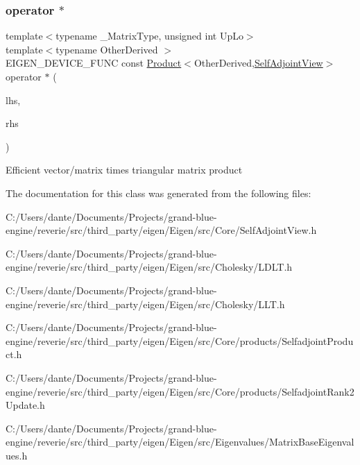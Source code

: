 \subsubsection{\texorpdfstring{operator $\ast$}{operator *}}
{\footnotesize\ttfamily template$<$typename \+\_\+\+Matrix\+Type, unsigned int Up\+Lo$>$ \\
template$<$typename Other\+Derived $>$ \\
E\+I\+G\+E\+N\+\_\+\+D\+E\+V\+I\+C\+E\+\_\+\+F\+U\+NC const \mbox{\hyperlink{class_eigen_1_1_product}{Product}}$<$Other\+Derived,\mbox{\hyperlink{class_eigen_1_1_self_adjoint_view}{Self\+Adjoint\+View}}$>$ operator $\ast$ (\begin{DoxyParamCaption}\item[{const \mbox{\hyperlink{class_eigen_1_1_matrix_base}{Matrix\+Base}}$<$ Other\+Derived $>$ \&}]{lhs,  }\item[{const \mbox{\hyperlink{class_eigen_1_1_self_adjoint_view}{Self\+Adjoint\+View}}$<$ \+\_\+\+Matrix\+Type, Up\+Lo $>$ \&}]{rhs }\end{DoxyParamCaption})\hspace{0.3cm}{\ttfamily [friend]}}

Efficient vector/matrix times triangular matrix product 

The documentation for this class was generated from the following files\+:\begin{DoxyCompactItemize}
\item 
C\+:/\+Users/dante/\+Documents/\+Projects/grand-\/blue-\/engine/reverie/src/third\+\_\+party/eigen/\+Eigen/src/\+Core/Self\+Adjoint\+View.\+h\item 
C\+:/\+Users/dante/\+Documents/\+Projects/grand-\/blue-\/engine/reverie/src/third\+\_\+party/eigen/\+Eigen/src/\+Cholesky/L\+D\+L\+T.\+h\item 
C\+:/\+Users/dante/\+Documents/\+Projects/grand-\/blue-\/engine/reverie/src/third\+\_\+party/eigen/\+Eigen/src/\+Cholesky/L\+L\+T.\+h\item 
C\+:/\+Users/dante/\+Documents/\+Projects/grand-\/blue-\/engine/reverie/src/third\+\_\+party/eigen/\+Eigen/src/\+Core/products/Selfadjoint\+Product.\+h\item 
C\+:/\+Users/dante/\+Documents/\+Projects/grand-\/blue-\/engine/reverie/src/third\+\_\+party/eigen/\+Eigen/src/\+Core/products/Selfadjoint\+Rank2\+Update.\+h\item 
C\+:/\+Users/dante/\+Documents/\+Projects/grand-\/blue-\/engine/reverie/src/third\+\_\+party/eigen/\+Eigen/src/\+Eigenvalues/Matrix\+Base\+Eigenvalues.\+h\end{DoxyCompactItemize}
